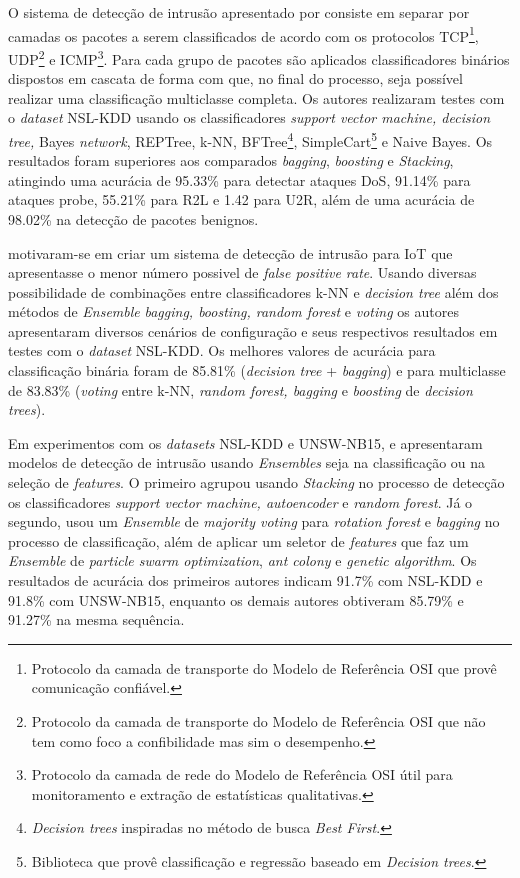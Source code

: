 O sistema de detecção de intrusão apresentado por  consiste em separar por camadas os pacotes a serem classificados de acordo com os protocolos TCP\footnote{Protocolo da camada de transporte do Modelo de Referência OSI que provê comunicação confiável.}, UDP\footnote{Protocolo da camada de transporte do Modelo de Referência OSI que não tem como foco a confibilidade mas sim o desempenho.} e ICMP\footnote{Protocolo da camada de rede do Modelo de Referência OSI útil para monitoramento e extração de estatísticas qualitativas.}. Para cada grupo de pacotes são aplicados classificadores binários dispostos em cascata de forma com que, no final do processo, seja possível realizar uma classificação multiclasse completa. Os autores realizaram testes com o \textit{dataset} NSL-KDD usando os classificadores \textit{support vector machine, decision tree,} Bayes \textit{network}, REPTree, k-NN, BFTree\footnote{\textit{Decision trees} inspiradas no método de busca \textit{Best First}.}, SimpleCart\footnote{Biblioteca que provê classificação e regressão baseado em \textit{Decision trees}.} e Naive Bayes. Os resultados foram superiores aos comparados \textit{bagging}, \textit{boosting} e \textit{Stacking}, atingindo uma acurácia de 95.33\% para detectar ataques DoS, 91.14\% para ataques probe, 55.21\% para R2L e 1.42 para U2R, além de uma acurácia de 98.02\% na detecção de pacotes benignos.

 motivaram-se em criar um sistema de detecção de intrusão para IoT que apresentasse o menor número possivel de \textit{false positive rate}. Usando diversas possibilidade de combinações entre classificadores k-NN e \textit{decision tree} além dos métodos de \textit{Ensemble} \textit{bagging, boosting, random forest} e \textit{voting} os autores apresentaram diversos cenários de configuração e seus respectivos resultados em testes com o \textit{dataset} NSL-KDD. Os melhores valores de acurácia para classificação binária foram de 85.81\% (\textit{decision tree} + \textit{bagging}) e para multiclasse de 83.83\% (\textit{voting} entre k-NN, \textit{random forest, bagging} e \textit{boosting} de \textit{decision trees}). 





Em experimentos com os \textit{datasets} NSL-KDD e UNSW-NB15,  e  apresentaram modelos de detecção de intrusão usando \textit{Ensembles} seja na classificação ou na seleção de \textit{features}. O primeiro agrupou usando \textit{Stacking} no processo de detecção os classificadores \textit{support vector machine, autoencoder} e \textit{random forest}. Já o segundo, usou um \textit{Ensemble} de \textit{majority voting} para \textit{rotation forest} e \textit{bagging} no processo de classificação, além de aplicar um seletor de \textit{features} que faz um \textit{Ensemble} de \textit{particle swarm optimization}, \textit{ant colony} e \textit{genetic algorithm}. Os resultados de acurácia dos primeiros autores indicam 91.7\% com NSL-KDD e 91.8\% com UNSW-NB15, enquanto os demais autores obtiveram 85.79\% e 91.27\% na mesma sequência.


